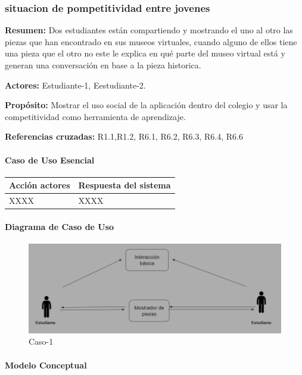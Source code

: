 \subsubsection{situacion de pompetitividad entre jovenes}

{\textbf {Resumen:}}
Dos estudiantes están compartiendo y mostrando el uno al otro las piezas que han encontrado en sus museos virtuales, cuando alguno de ellos tiene una pieza que el otro no este le explica en qué parte del museo virtual está y generan una conversación en base a la pieza historica.

{\textbf {Actores:}}
Estudiante-1, Eestudiante-2.

{\textbf {Propósito:}}
Mostrar el uso social de la aplicación dentro del colegio y usar la competitividad como herramienta de aprendizaje.

{\textbf {Referencias cruzadas:}}
R1.1,R1.2, R6.1, R6.2, R6.3, R6.4, R6.6

\paragraph{Caso de Uso Esencial}

\begin{longtable}{|p{5cm}|p{8cm}|}
\hline 
Acción actores & Respuesta del sistema \\ 
\hline 
XXXX & XXXX \\ 
\hline 
\end{longtable}

\paragraph{Diagrama de Caso de Uso}

\begin{figure}[H]
\centerline{\includegraphics[width=15cm]{imgs/CasoUso_3.PNG}}
\caption{Caso-1}
\label{fig}
\end{figure}

\paragraph{Modelo Conceptual}

